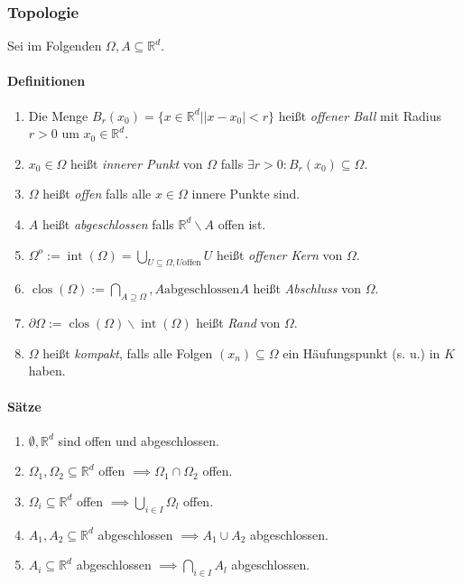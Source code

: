 \documentclass[a4paper, 9pt, DIV=24]{scrartcl}
\DeclareMathOperator{\clos}{clos}
\DeclareMathOperator{\Int}{int}
\newcommand{\R}{\mathbb{R}}
\begin{document}
\subsubsection{Topologie}
Sei im Folgenden $\Omega, A \subseteq \R^d$.
\paragraph{Definitionen}
\begin{enumerate}[label={(}\arabic*{)}]
 \item Die Menge $B_r(x_0) = \{x \in \R^d \left| |x-x_0| < r \right.\}$ heißt \emph{offener Ball} mit Radius $r > 0$ um $x_0 \in\R^d$.
 \item $x_0 \in \Omega$ heißt \emph{innerer Punkt} von $\Omega$ falls $\exists r > 0: B_r(x_0) \subseteq \Omega$.
 \item $\Omega$ heißt \emph{offen} falls alle $x \in \Omega$ innere Punkte sind.
 \item $A$ heißt \emph{abgeschlossen} falls $\R^d\backslash A$ offen ist.
 \item $\Omega^{o} := \Int(\Omega) = \bigcup_{U\subseteq\Omega,U \text{offen}} U$ heißt \emph{offener Kern} von $\Omega$.
 \item $\clos(\Omega) := \bigcap_{A\supseteq \Omega}, A \text{abgeschlossen} A$ heißt \emph{Abschluss} von $\Omega$.
 \item $\partial\Omega := \clos(\Omega)\backslash\Int(\Omega)$ heißt \emph{Rand} von $\Omega$.
 \item $\Omega$ heißt \emph{kompakt}, falls alle Folgen $(x_n) \subseteq \Omega$ ein Häufungs\-punkt (s. u.) in $K$ haben.
\end{enumerate}

\paragraph{Sätze}
\begin{enumerate}[label={(}\arabic*{)}]
 \item $\emptyset, \R^d$ sind offen und abgeschlossen.
 \item $\Omega_1, \Omega_2 \subseteq \R^d$ offen $\implies \Omega_1 \cap \Omega_2$ offen.
 \item $\Omega_i \subseteq \R^d$ offen $\implies \bigcup_{i\in I} \Omega_l$ offen.
 \item $A_1, A_2 \subseteq \R^d$ abgeschlossen $\implies A_1 \cup A_2$ abgeschlossen.
 \item $A_i \subseteq \R^d$ abgeschlossen $\implies \bigcap_{i\in I} A_l$ abgeschlossen.
\end{enumerate}
\end{document}
